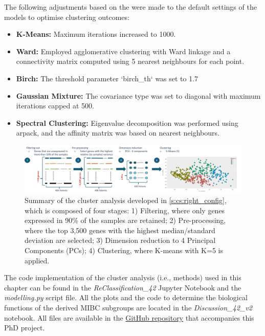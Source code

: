The following adjustments based on the \citet{Scikit-learn_undated-ax} were made to the default settings of the models to optimise clustering outcomes:
\begin{itemize}
    \item \textbf{K-Means:} Maximum iterations increased to 1000.
    \item \textbf{Ward:} Employed agglomerative clustering with Ward linkage and a connectivity matrix computed using 5 nearest neighbours for each point.
    \item \textbf{Birch:} The threshold parameter `birch\_th` was set to 1.7
    \item \textbf{Gaussian Mixture:} The covariance type was set to diagonal with maximum iterations capped at 500.
    \item \textbf{Spectral Clustering:} Eigenvalue decomposition was performed using arpack, and the affinity matrix was based on nearest neighbours.
\end{itemize}

\begin{figure}
    \centering
    \includegraphics[width=1.0\textwidth,height=1.0\textheight,keepaspectratio]{Sections/ClusteringAnalysis/Resources/clustering_pipeline.png}
    \caption[Cluster analysis pipeline]{Summary of the cluster analysis developed in \cref{s:cs:right_config}, which is composed of four stages: 1) Filtering, where only genes expressed in 90\% of the samples are retained; 2) Pre-processing, where the top 3,500 genes with the highest median/standard deviation are selected; 3) Dimension reduction to 4 Principal Components (PCs); 4) Clustering, where K-means with K=5 is applied.}
    \label{fig:cs:clustering_pipeline}
\end{figure}

The code implementation of the cluster analysis (i.e., methods) used in this chapter can be found in the \textit{ReClassification\_42} Jupyter Notebook and the \textit{modelling.py} script file. All the plots and the code to determine the biological functions of the derived MIBC subgroups are located in the \textit{Discussion\_42\_v2} notebook. All files are available in the \href{https://github.com/vladUng/Phd_thesis_exp}{GitHub repository} that accompanies this PhD project.

